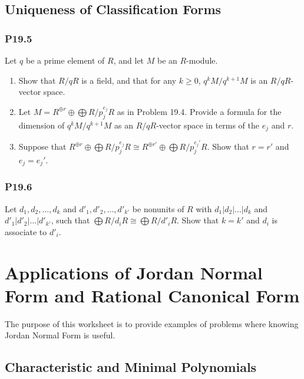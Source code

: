 \documentclass[lang=cn,11pt]{template}
\begin{document}
\section{Uniqueness of Classification Forms}

\subsection*{P19.5} Let \( q \) be a prime element of \( R \), and let \( M \) be an \( R \)-module.
\begin{enumerate}
    \item Show that \( R / q R \) is a field, and that for any \( k \geq 0 \), \( q^k M / q^{k+1} M \) is an \( R / q R \)-vector space.
    \item Let \( M = R^{\oplus r} \oplus \bigoplus R / p_j^{e_j} R \) as in Problem 19.4. Provide a formula for the dimension of \( q^k M / q^{k+1} M \) as an \( R / q R \)-vector space in terms of the \( e_j \) and \( r \).
    \item Suppose that \( R^{\oplus r} \oplus \bigoplus R / p_j^{e_j} R \cong R^{\oplus r'} \oplus \bigoplus R / p_j^{e_j'} R \). Show that \( r = r' \) and \( e_j = e_j' \).
\end{enumerate}

\subsection*{P19.6} Let \( d_1, d_2, \dots, d_k \) and \( d'_1, d'_2, \dots, d'_{k'} \) be nonunits of \( R \) with \( d_1 | d_2 | \dots | d_k \) and \( d'_1 | d'_2 | \dots | d'_{k'} \), such that \( \bigoplus R / d_i R \cong \bigoplus R / d'_i R \). Show that \( k = k' \) and \( d_i \) is associate to \( d'_i \).











\chapter{Applications of Jordan Normal Form and Rational Canonical Form}

The purpose of this worksheet is to provide examples of problems where knowing Jordan Normal Form is useful.

\section{Characteristic and Minimal Polynomials}
\end{document}
